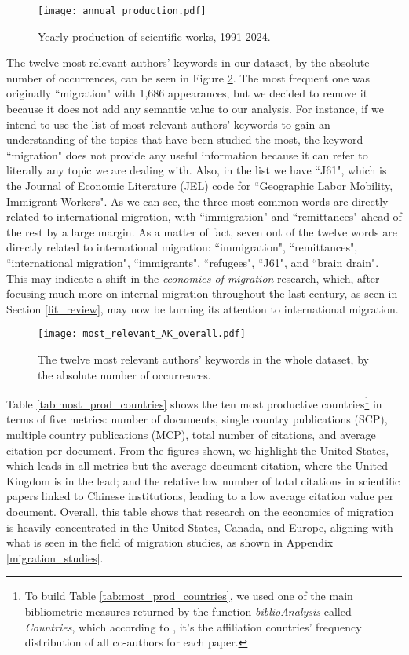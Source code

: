 \begin{figure}[!ht]
	\centering
	\texttt{[image: annual\_production.pdf]}
	\caption{Yearly production of scientific works, 1991-2024.}
	\label{fig:annual_production}
\end{figure}

The twelve most relevant authors' keywords in our dataset, by the absolute number of occurrences, can be seen in Figure \ref{fig:most_relevant_AK}. The most frequent one was originally ``migration" with 1,686 appearances, but we decided to remove it because it does not add any semantic value to our analysis. For instance, if we intend to use the list of most relevant authors' keywords to gain an understanding of the topics that have been studied the most, the keyword ``migration" does not provide any useful information because it can refer to literally any topic we are dealing with. Also, in the list we have ``J61", which is the Journal of Economic Literature (JEL) code for ``Geographic Labor Mobility, Immigrant Workers". As we can see, the three most common words are directly related to international migration, with ``immigration" and ``remittances" ahead of the rest by a large margin. As a matter of fact, seven out of the twelve words are directly related to international migration: ``immigration", ``remittances", ``international migration", ``immigrants", ``refugees", ``J61", and ``brain drain". This may indicate a shift in the \textit{economics of migration} research, which, after focusing much more on internal migration throughout the last century, as seen in Section \ref{lit_review}, may now be turning its attention to international migration.

\begin{figure}[!ht]
	\centering
	\texttt{[image: most\_relevant\_AK\_overall.pdf]}
	\caption{The twelve most relevant authors' keywords in the whole dataset, by the absolute number of occurrences.}
	\label{fig:most_relevant_AK}
\end{figure}

Table \ref{tab:most_prod_countries} shows the ten most productive countries\footnote{To build Table \ref{tab:most_prod_countries}, we used one of the main bibliometric measures returned by the function \textit{biblioAnalysis} called \textit{Countries}, which according to \cite{aria_bibliometrix_2017}, it's the affiliation countries’ frequency distribution of all co-authors for each paper.} in terms of five metrics: number of documents, single country publications (SCP), multiple country publications (MCP), total number of citations, and average citation per document. From the figures shown, we highlight the United States, which leads in all metrics but the average document citation, where the United Kingdom is in the lead; and the relative low number of total citations in scientific papers linked to Chinese institutions, leading to a low average citation value per document. Overall, this table shows that research on the economics of migration is heavily concentrated in the United States, Canada, and Europe, aligning with what is seen in the field of migration studies, as shown in Appendix \ref{migration_studies}.

